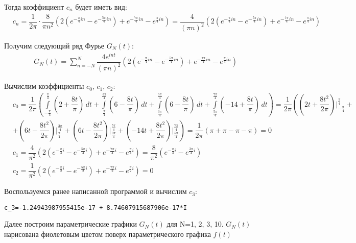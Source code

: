 \documentclass[a4paper, 16pt]{article}
\begin{document}
\noindent Тогда коэффициент $c_n$ будет иметь вид:
\begin{align*}
    & c_n=\dfrac{1}{2\pi}\cdot\dfrac{8}{\pi n^2}\left(2\left(e^{-\frac{\pi}{4}in}-e^{-\frac{5\pi}{4}in}\right)+e^{-\frac{7\pi}{4}in}-e^{\frac{\pi}{4}in}\right)=\dfrac{4}{\left(\pi n\right)^2}\left(2\left(e^{-\frac{\pi}{4}in}-e^{-\frac{5\pi}{4}in}\right)+e^{-\frac{7\pi}{4}in}-e^{\frac{\pi}{4}in}\right)
\end{align*}


\noindent Получим следующий ряд Фурье $G_N(t)$:
\begin{align*}
    & G_N(t)=\sum_{n=-N}^{N}\dfrac{4e^{int}}{\left(\pi n\right)^2}\left(2\left(e^{-\frac{\pi}{4}in}-e^{-\frac{5\pi}{4}in}\right)+e^{-\frac{7\pi}{4}in}-e^{\frac{\pi}{4}in}\right)
\end{align*}


\noindent Вычислим коэффициенты $c_0,\,c_1,\,c_2$:
\begin{align*}
    & c_0=\dfrac{1}{2\pi}\left(\int\limits_{-\frac{\pi}{4}}^{\frac{\pi}{4}}\left(2+\dfrac{8t}{\pi}\right)\,dt+\int\limits_{\frac{\pi}{4}}^{\frac{3\pi}{4}}\left(6-\dfrac{8t}{\pi}\right)\,dt+\int\limits_{\frac{3\pi}{4}}^{\frac{5\pi}{4}}\left(6-\dfrac{8t}{\pi}\right)\,dt+\int\limits_{\frac{5\pi}{4}}^{\frac{7\pi}{4}}\left(-14+\dfrac{8t}{\pi}\right)\,dt\right)=\dfrac{1}{2\pi}\left(\left(2t+\dfrac{8t^2}{2\pi}\right)\bigg|_{-\frac{\pi}{4}}^{\frac{\pi}{4}}+\right.\\
    & \left. +\left(6t-\dfrac{8t^2}{2\pi}\right)\bigg|_{\frac{\pi}{4}}^{\frac{3\pi}{4}}+\left(6t-\dfrac{8t^2}{2\pi}\right)\bigg|_{\frac{3\pi}{4}}^{\frac{5\pi}{4}}+\left(-14t+\dfrac{8t^2}{2\pi}\right)\bigg|_{\frac{5\pi}{4}}^{\frac{7\pi}{4}}\right)=\dfrac{1}{2\pi}\left(\pi+\pi-\pi-\pi\right)=0\\
    & c_1=\dfrac{4}{\pi^2}\left(2\left(e^{-\frac{\pi}{4}i}-e^{-\frac{5\pi}{4}i}\right)+e^{-\frac{7\pi}{4}i}-e^{\frac{\pi}{4}i}\right)=\dfrac{8}{\pi^2}\left(e^{-\frac{\pi}{4}i}-e^{\frac{3\pi}{4}i}\right)\\
    & c_2=\dfrac{1}{\pi^2}\left(2\left(e^{-\frac{\pi}{2}i}-e^{-\frac{5\pi}{2}i}\right)+e^{-\frac{7\pi}{2}i}-e^{\frac{\pi}{2}i}\right)=0
\end{align*}


\noindent Воспользуемся ранее написанной программой и вычислим $c_3$:
\begin{lstlisting}
c_3=-1.24943987955415e-17 + 8.74607915687906e-17*I
\end{lstlisting}


\noindent Далее построим параметрические графики $G_N(t)$ для N=1, 2, 3, 10. $G_N(t)$
нарисована фиолетовым цветом поверх параметрического графика $f(t)$
\end{document}
